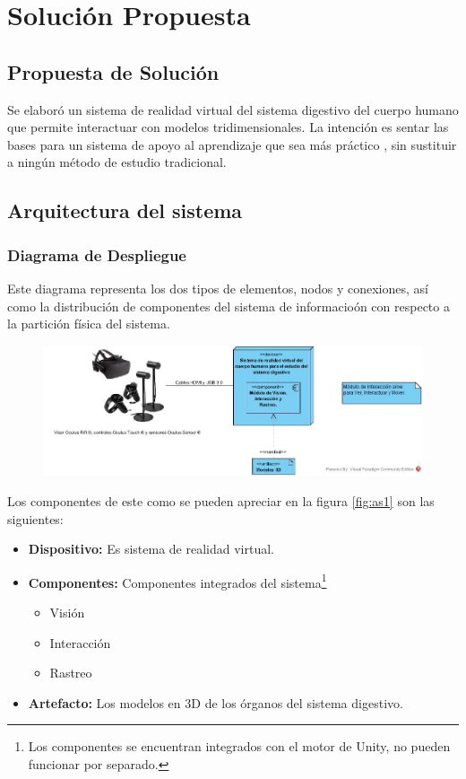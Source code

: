 \chapter{Solución Propuesta}

\section{Propuesta de Solución}
Se elaboró un sistema de realidad virtual del sistema digestivo del cuerpo humano que permite interactuar con modelos tridimensionales.
 La intención es sentar las bases para un sistema de apoyo al aprendizaje que sea más práctico \cite{moore1995learning}, 
 sin sustituir a ningún método de estudio tradicional.\\

\section{Arquitectura del sistema}

\subsection{Diagrama de Despliegue}
Este diagrama representa los dos tipos de elementos, nodos y conexiones, as\'i como la distribuci\'on de componentes del sistema 
de informacio\'on con respecto a la partici\'on f\'isica del sistema.\\
\begin{figure}[H]
	\begin{center}
 		\includegraphics[width = 1\textwidth]{v3/images/cu2.jpg}
	\end{center} 
\end{figure}
Los componentes de este como se pueden apreciar en la figura \ref{fig:as1} son las siguientes:
\begin{itemize}
  \item \textbf{Dispositivo:} Es sistema de realidad virtual.
  \item \textbf{Componentes:} Componentes integrados del sistema\footnote{Los componentes se encuentran integrados con el motor de Unity, no pueden funcionar por separado.}
  \begin{itemize}
    \item Visión
    \item Interacción
    \item Rastreo  
  \end{itemize}
  \item \textbf{Artefacto:} Los modelos en 3D de los \'organos del sistema digestivo.
\end{itemize}

